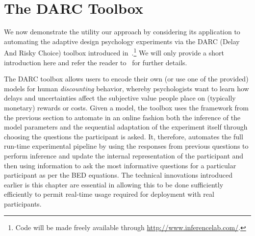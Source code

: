 
\section{The DARC Toolbox}
\label{sec:design:darc}

We now demonstrate the utility our approach by considering its application 
to automating the adaptive design psychology experiments via the DARC (Delay
And Risky Choice) toolbox introduced in~\cite{vincent2017darc}.\footnote{Code will be made freely
	available through \url{http://www.inferencelab.com/}.}  We will only provide
a short introduction here and refer the reader to~\cite{vincent2017darc} for further details.

The DARC toolbox allows users 
to encode their own (or use one of the provided) models for human \emph{discounting} behavior,
whereby psychologists want to learn how delays and uncertainties affect the subjective value people place
on (typically monetary) rewards or costs. Given a model, the toolbox uses the framework from the
previous section to automate in an online fashion 
both the inference of the model parameters and the sequential adaptation of the experiment itself through
choosing the questions the participant is asked.  It, therefore, automates the full run-time experimental 
pipeline  by using the responses from previous questions to perform inference 
and update the internal representation
of the participant and then using information to ask the most informative questions for a particular
participant as per the BED equations.  The technical innovations introduced earlier is this chapter
are essential in allowing this to be done sufficiently efficiently to permit
real-time usage required for deployment with real participants.

